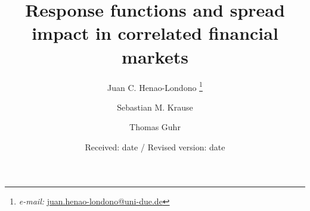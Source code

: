 \title{Response functions and spread impact in correlated financial markets}
\author{Juan C. Henao-Londono
        \thanks{\emph{e-mail: }\href{mailto:juan.henao-londono@uni-due.de}
        {juan.henao-londono@uni-due.de}}
        \and Sebastian M. Krause
        \and Thomas Guhr}
\date{Received: date / Revised version: date}
